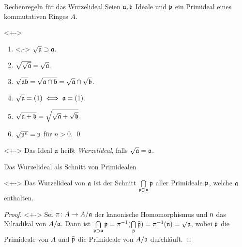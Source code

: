 \begin{frame}{Rechenregeln für das Wurzelideal}
    Seien \(\mathfrak{a}, \mathfrak{b}\) Ideale und \(\mathfrak{p}\) ein Primideal eines
    kommutativen Ringes \(A\).
    \begin{proposition}<+->
    	\label{prop:radical}
        \begin{enumerate}[<+->]
        \item<.->
            \(\sqrt{\mathfrak{a}} \supset \mathfrak{a}\).
        \item
            \(\sqrt{\sqrt{\mathfrak{a}}} = \sqrt{\mathfrak{a}}\).
        \item
            \(\sqrt{\mathfrak{a} \mathfrak{b}} = \sqrt{\mathfrak{a} \cap \mathfrak{b}}
            = \sqrt{\mathfrak{a}} \cap \sqrt{\mathfrak{b}}\).
        \item
            \(\sqrt{\mathfrak{a}} = (1) \iff \mathfrak{a} = (1)\).
        \item
            \(\sqrt{\mathfrak{a} + \mathfrak{b}} = \sqrt{\sqrt{\mathfrak{a}}
            + \sqrt{\mathfrak{b}}}\).
        \item
            \(\sqrt{\mathfrak{p}^n} = \mathfrak{p}\) für \(n > 0\).
            \qed
        \end{enumerate}
    \end{proposition}
    \begin{definition}<+->
        Das Ideal \(\mathfrak{a}\) heißt \emph{Wurzelideal}, falls \(\sqrt{\mathfrak{a}}
        = \mathfrak{a}\).
    \end{definition}
\end{frame}

\begin{frame}{Das Wurzelideal als Schnitt von Primidealen}
    \begin{proposition}<+->
        Das Wurzelideal von \(\mathfrak{a}\) ist der Schnitt \(\bigcap\limits_{\mathfrak{p} \supset \mathfrak{a}} \mathfrak{p}\) aller Primideale
        \(\mathfrak{p}\), welche \(\mathfrak{a}\) enthalten.
    \end{proposition}
    \begin{proof}<+->
        Sei \(\pi\colon A \to A/\mathfrak{a}\) der kanonische Homomorphismus und
        \(\mathfrak{n}\) das Nilradikal von \(A/\mathfrak{a}\).
        Dann ist
        \(\bigcap\limits_{\mathfrak{p} \supset \mathfrak{a}} \mathfrak{p}
        = \pi^{-1}(\bigcap\limits_{\bar{\mathfrak{p}}} \bar{\mathfrak{p}})
        = \pi^{-1}(\mathfrak{n}) = \sqrt{\mathfrak{a}}\),
	    wobei \(\mathfrak{p}\) die Primideale von \(A\) und \(\bar{\mathfrak{p}}\) die
	    Primideale von \(A/\mathfrak{a}\) durchläuft.
    \end{proof}
\end{frame}

